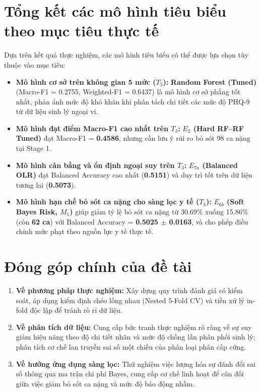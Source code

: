 \section{Tổng kết các mô hình tiêu biểu theo mục tiêu thực tế}
\label{sec:khuyen-nghi-mo-hinh}

Dựa trên kết quả thực nghiệm, các mô hình tiêu biểu có thể được lựa chọn tùy thuộc vào mục tiêu:
\begin{itemize}
    \item \textbf{Mô hình cơ sở trên không gian 5 mức ($T_5$):} \textbf{Random Forest (Tuned)} (Macro-F1 = 0.2755, Weighted-F1 = 0.6437) là mô hình cơ sở phẳng tốt nhất, phản ánh mức độ khó khăn khi phân tách chi tiết các mức độ PHQ-9 từ dữ liệu sinh lý ngoại vi.
    \item \textbf{Mô hình đạt điểm Macro-F1 cao nhất trên $T_3$:} \textbf{$E_2$ (Hard RF--RF Tuned)} đạt Macro-F1 = \textbf{0.4586}, nhưng cần lưu ý rủi ro bỏ sót 98 ca nặng tại Stage 1.
    \item \textbf{Mô hình cân bằng và ổn định ngoại suy trên $T_3$:} \textbf{$E_{7a}$ (Balanced OLR)} đạt Balanced Accuracy cao nhất (\textbf{0.5151}) và duy trì tốt trên dữ liệu tương lai (\textbf{0.5073}).
    \item \textbf{Mô hình hạn chế bỏ sót ca nặng cho sàng lọc y tế ($T_3$):} \textbf{$E_{6b}$ (Soft Bayes Risk, $M_1$)} giúp giảm tỷ lệ bỏ sót ca nặng từ 30.69\% xuống 15.86\% (còn \textbf{62 ca}) với Balanced Accuracy = \textbf{0.5025 $\pm$ 0.0163}, và cho phép điều chỉnh mức phạt theo nguồn lực y tế thực tế.
\end{itemize}

\section{Đóng góp chính của đề tài}
\label{sec:dong-gop-de-tai}

\begin{enumerate}
    \item \textbf{Về phương pháp thực nghiệm:} Xây dựng quy trình đánh giá có kiểm soát, áp dụng kiểm định chéo lồng nhau (Nested 5-Fold CV) và tiền xử lý in-fold độc lập để tránh rò rỉ dữ liệu.
    \item \textbf{Về phân tích dữ liệu:} Cung cấp bức tranh thực nghiệm rõ ràng về sự suy giảm hiệu năng theo độ chi tiết nhãn và mức độ chồng lấn phân phối sinh lý; phân tích cơ chế lan truyền sai số một chiều của phân loại phân cấp cứng.
    \item \textbf{Về hướng ứng dụng sàng lọc:} Thử nghiệm việc lượng hóa sự đánh đổi sai số thông qua ma trận chi phí Bayes, cung cấp cơ chế linh hoạt để cân đối giữa việc giảm bỏ sót ca nặng và mức độ báo động nhầm.
\end{enumerate}

